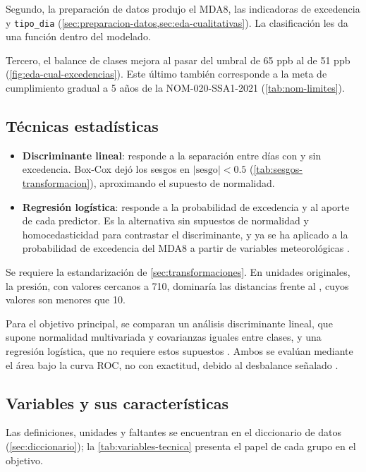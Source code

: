 Segundo, la preparación de datos produjo el MDA8, las indicadoras de
excedencia y \texttt{tipo\_dia}
(\cref{sec:preparacion-datos,sec:eda-cualitativas}). La clasificación les da
una función dentro del modelado.

Tercero, el balance de clases mejora al pasar del umbral de 65 ppb al de
51 ppb (\cref{fig:eda-cual-excedencias}). Este último también corresponde a
la meta de cumplimiento gradual a 5 años de la NOM-020-SSA1-2021
(\cref{tab:nom-limites}).

\subsection{Técnicas estadísticas}
\label{sec:obj:tecnicas}

\begin{itemize}
    \item \textbf{Discriminante lineal}: responde a la separación entre días
      con y sin excedencia. Box-Cox dejó los sesgos en $|\text{sesgo}| < 0.5$
      (\cref{tab:sesgos-transformacion}), aproximando el supuesto de
      normalidad.
    \item \textbf{Regresión logística}: responde a la probabilidad de
      excedencia y al aporte de cada predictor. Es la alternativa sin
      supuestos de normalidad y homocedasticidad para contrastar el
      discriminante, y ya se ha aplicado a la probabilidad de excedencia del
      MDA8 a partir de variables meteorológicas \parencite{otero2016}.
\end{itemize}

Se requiere la estandarización de
\cref{sec:transformaciones}. En unidades originales, la presión, con valores
cercanos a 710, dominaría las distancias frente al , cuyos valores son
menores que 10.

Para el objetivo principal, se comparan un análisis discriminante lineal, que
supone normalidad multivariada y covarianzas iguales entre clases, y una
regresión logística, que no requiere estos supuestos
\parencite{hosmer2013}. Ambos se evalúan mediante el área bajo la curva ROC,
no con exactitud, debido al desbalance señalado \parencite{saito2015}.

\subsection{Variables y sus características}
\label{sec:obj:variables}

Las definiciones, unidades y faltantes se encuentran en el diccionario de
datos (\cref{sec:diccionario}); la \cref{tab:variables-tecnica} presenta el
papel de cada grupo en el objetivo.

